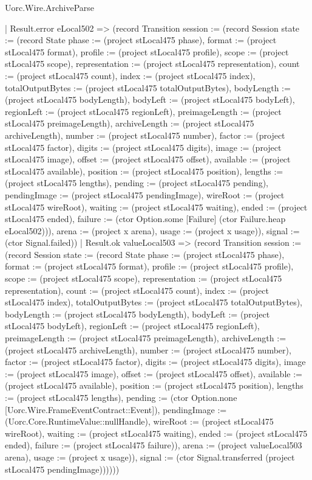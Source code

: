 \begin{lexlean}{Uorc.Wire.ArchiveParse}
\begin{semanticmodule}
{            | Result.error eLocal502 => (record Transition {session := (record Session {state := (record State {phase := (project stLocal475 phase), format := (project stLocal475 format), profile := (project stLocal475 profile), scope := (project stLocal475 scope), representation := (project stLocal475 representation), count := (project stLocal475 count), index := (project stLocal475 index), totalOutputBytes := (project stLocal475 totalOutputBytes), bodyLength := (project stLocal475 bodyLength), bodyLeft := (project stLocal475 bodyLeft), regionLeft := (project stLocal475 regionLeft), preimageLength := (project stLocal475 preimageLength), archiveLength := (project stLocal475 archiveLength), number := (project stLocal475 number), factor := (project stLocal475 factor), digits := (project stLocal475 digits), image := (project stLocal475 image), offset := (project stLocal475 offset), available := (project stLocal475 available), position := (project stLocal475 position), lengths := (project stLocal475 lengths), pending := (project stLocal475 pending), pendingImage := (project stLocal475 pendingImage), wireRoot := (project stLocal475 wireRoot), waiting := (project stLocal475 waiting), ended := (project stLocal475 ended), failure := (ctor Option.some [Failure] (ctor Failure.heap eLocal502))}), arena := (project x arena), usage := (project x usage)}), signal := (ctor Signal.failed)})
            | Result.ok valueLocal503 => (record Transition {session := (record Session {state := (record State {phase := (project stLocal475 phase), format := (project stLocal475 format), profile := (project stLocal475 profile), scope := (project stLocal475 scope), representation := (project stLocal475 representation), count := (project stLocal475 count), index := (project stLocal475 index), totalOutputBytes := (project stLocal475 totalOutputBytes), bodyLength := (project stLocal475 bodyLength), bodyLeft := (project stLocal475 bodyLeft), regionLeft := (project stLocal475 regionLeft), preimageLength := (project stLocal475 preimageLength), archiveLength := (project stLocal475 archiveLength), number := (project stLocal475 number), factor := (project stLocal475 factor), digits := (project stLocal475 digits), image := (project stLocal475 image), offset := (project stLocal475 offset), available := (project stLocal475 available), position := (project stLocal475 position), lengths := (project stLocal475 lengths), pending := (ctor Option.none [Uorc.Wire.FrameEventContract::Event]), pendingImage := (Uorc.Core.RuntimeValue::nullHandle), wireRoot := (project stLocal475 wireRoot), waiting := (project stLocal475 waiting), ended := (project stLocal475 ended), failure := (project stLocal475 failure)}), arena := (project valueLocal503 arena), usage := (project x usage)}), signal := (ctor Signal.transferred (project stLocal475 pendingImage))}))))
}
\end{semanticmodule}
\end{lexlean}
